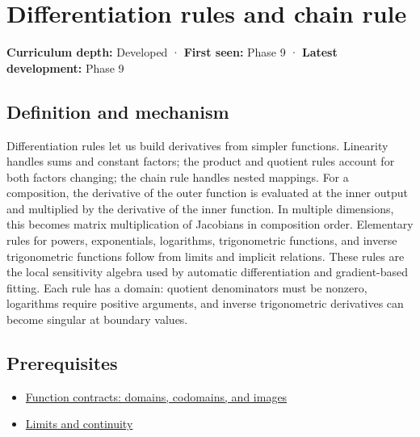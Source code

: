 \hypertarget{appendix-d9f70bdfbc92}{}\label{referencestart:appendix-d9f70bdfbc92}
\section{Differentiation rules and chain rule}\label{appendix-d9f70bdfbc92-differentiation-rules-and-chain-rule}

\hypertarget{appendix-d9f70bdfbc92-differentiation-rules-and-chain-rule}{}

\textbf{Curriculum depth:} Developed · \textbf{First seen:} Phase 9 · \textbf{Latest development:} Phase 9

\begin{allmightroledefinition}

\subsection{Definition and mechanism}\label{appendix-d9f70bdfbc92-definition-and-mechanism}

\hypertarget{appendix-d9f70bdfbc92-definition-and-mechanism}{}

Differentiation rules let us build derivatives from simpler functions. Linearity handles sums and constant factors; the product and quotient rules account for both factors changing; the chain rule handles nested mappings. For a composition, the derivative of the outer function is evaluated at the inner output and multiplied by the derivative of the inner function. In multiple dimensions, this becomes matrix multiplication of Jacobians in composition order. Elementary rules for powers, exponentials, logarithms, trigonometric functions, and inverse trigonometric functions follow from limits and implicit relations. These rules are the local sensitivity algebra used by automatic differentiation and gradient-based fitting. Each rule has a domain: quotient denominators must be nonzero, logarithms require positive arguments, and inverse trigonometric derivatives can become singular at boundary values.

\end{allmightroledefinition}

\subsection{Prerequisites}\label{appendix-d9f70bdfbc92-prerequisites}

\hypertarget{appendix-d9f70bdfbc92-prerequisites}{}

\begin{itemize}
\tightlist
\item
  \hyperref[appendix-a59658325cd6]{Function contracts: domains, codomains, and images}
\item
  \hyperref[appendix-fecc1847f5a3]{Limits and continuity}
\end{itemize}

